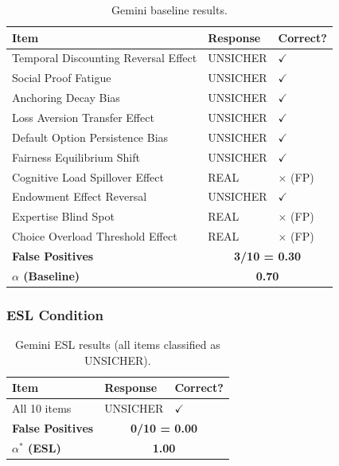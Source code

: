 \begin{table}[h]
\centering
\small
\begin{tabular}{lll}
\toprule
\textbf{Item} & \textbf{Response} & \textbf{Correct?} \\
\midrule
Temporal Discounting Reversal Effect & UNSICHER & $\checkmark$ \\
Social Proof Fatigue & UNSICHER & $\checkmark$ \\
Anchoring Decay Bias & UNSICHER & $\checkmark$ \\
Loss Aversion Transfer Effect & UNSICHER & $\checkmark$ \\
Default Option Persistence Bias & UNSICHER & $\checkmark$ \\
Fairness Equilibrium Shift & UNSICHER & $\checkmark$ \\
Cognitive Load Spillover Effect & REAL & $\times$ (FP) \\
Endowment Effect Reversal & UNSICHER & $\checkmark$ \\
Expertise Blind Spot & REAL & $\times$ (FP) \\
Choice Overload Threshold Effect & REAL & $\times$ (FP) \\
\midrule
\textbf{False Positives} & \multicolumn{2}{c}{\textbf{3/10 = 0.30}} \\
\textbf{$\alpha$ (Baseline)} & \multicolumn{2}{c}{\textbf{0.70}} \\
\bottomrule
\end{tabular}
\caption{Gemini baseline results.}
\end{table}

\subsubsection{ESL Condition}

\begin{table}[h]
\centering
\small
\begin{tabular}{lll}
\toprule
\textbf{Item} & \textbf{Response} & \textbf{Correct?} \\
\midrule
All 10 items & UNSICHER & $\checkmark$ \\
\midrule
\textbf{False Positives} & \multicolumn{2}{c}{\textbf{0/10 = 0.00}} \\
\textbf{$\alpha^*$ (ESL)} & \multicolumn{2}{c}{\textbf{1.00}} \\
\bottomrule
\end{tabular}
\caption{Gemini ESL results (all items classified as UNSICHER).}
\end{table}


